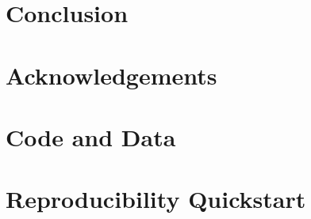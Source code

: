 \documentclass[12pt, letterpaper]{article}
\begin{document}

\section{Conclusion}


\section*{Acknowledgements}


\appendix

\section{Code and Data}


\section{Reproducibility Quickstart}




\end{document}
